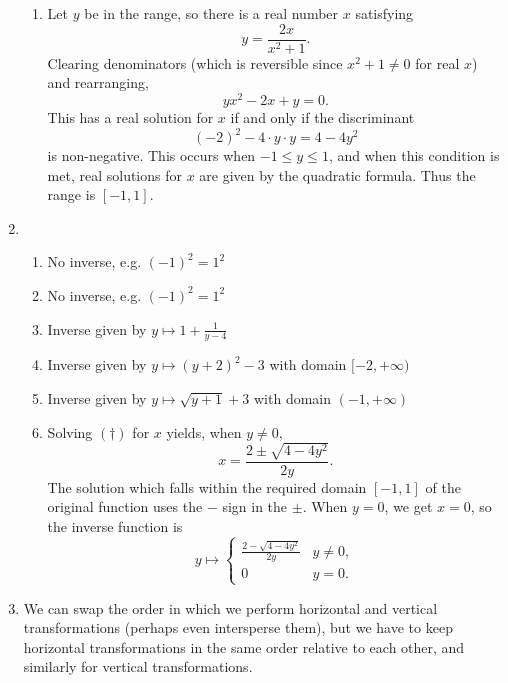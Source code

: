 \begin{enumerate}
\begin{enumerate}
\item Let $y$ be in the range, so there is a real number $x$ satisfying
\begin{equation*}
y = \frac{2x}{x^2 + 1}.
\end{equation*}
Clearing denominators (which is reversible since $x^2 + 1\neq 0$ for real $x$) and rearranging,
\begin{equation*}
yx^2 - 2x + y = 0. \tag{$\dagger$}
\end{equation*}
This has a real solution for $x$ if and only if the discriminant
\begin{equation*}
(-2)^2 - 4\cdot y\cdot y = 4 - 4y^2
\end{equation*}
is non-negative. This occurs when $-1\leq y\leq 1$, and when this condition is met, real solutions for $x$ are given by the quadratic formula. Thus the range is $[-1,1]$.
\end{enumerate}
\item \begin{enumerate}
\item No inverse, e.g. $(-1)^2 = 1^2$
\item No inverse, e.g. $(-1)^2 = 1^2$
\item Inverse given by $y\mapsto 1 + \tfrac{1}{y - 4}$
\item Inverse given by $y\mapsto (y + 2)^2 - 3$ with domain $[-2, +\infty)$
\item Inverse given by $y\mapsto\sqrt{y + 1} + 3$ with domain $(-1, +\infty)$
\item Solving $(\dagger)$ for $x$ yields, when $y\neq 0$,
\begin{equation*}
x = \frac{2\pm\sqrt{4 - 4y^2}}{2y}.
\end{equation*}
The solution which falls within the required domain $[-1,1]$ of the original function uses the $-$ sign in the $\pm$. When $y = 0$, we get $x = 0$, so the inverse function is
\begin{equation*}
y\longmapsto\begin{cases} \frac{2 - \sqrt{4 - 4y^2}}{2y} & y\neq 0, \\ 0 & y = 0. \end{cases}
\end{equation*}
\end{enumerate}
\item We can swap the order in which we perform horizontal and vertical transformations (perhaps even intersperse them), but we have to keep horizontal transformations in the same order relative to each other, and similarly for vertical transformations.

\end{enumerate}
